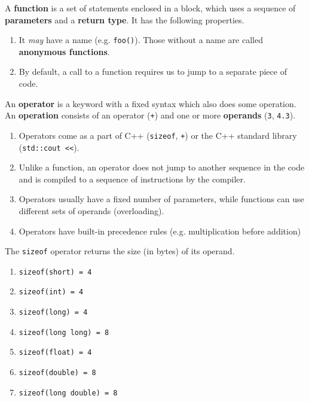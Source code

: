 \documentclass{article}
\newcounter{definition}[section]
\newcounter{code}[section]
\begin{document}
    \begin{definition}[Function]
      \label{def:function}
      A \textbf{function} is a set of statements enclosed in a block, which uses a sequence of \textbf{parameters} and a \textbf{return type}. It has the following properties. 
      \begin{enumerate}
        \item It \textit{may} have a name (e.g. \texttt{foo()}). Those without a name are called \textbf{anonymous functions}. 
        \item By default, a call to a function requires us to jump to a separate piece of code. 
      \end{enumerate}
    \end{definition}

    \begin{definition}[Operations]
      \label{def:operations}
      An \textbf{operator} is a keyword with a fixed syntax which also does some operation. An \textbf{operation} consists of an operator (\texttt{+}) and one or more \textbf{operands} (\texttt{3}, \texttt{4.3}).  
      \begin{enumerate}
        \item Operators come as a part of C++ (\texttt{sizeof}, \texttt{+}) or the C++ standard library (\texttt{std::cout <<}). 
        \item Unlike a function, an operator does not jump to another sequence in the code and is compiled to a sequence of instructions by the compiler. 
        \item Operators usually have a fixed number of parameters, while functions can use different sets of operands (overloading). 
        \item Operators have built-in precedence rules (e.g. multiplication before addition) 
      \end{enumerate}
    \end{definition}

    \begin{definition}
      \label{def:sizeof-operator}
      The \texttt{sizeof} operator returns the size (in bytes) of its operand. 
      \begin{enumerate}
        \item \texttt{sizeof(short) = 4}
        \item \texttt{sizeof(int) = 4}
        \item \texttt{sizeof(long) = 4}
        \item \texttt{sizeof(long long) = 8}
        \item \texttt{sizeof(float) = 4}
        \item \texttt{sizeof(double) = 8}
        \item \texttt{sizeof(long double) = 8}
      \end{enumerate} 
    \end{definition}
\end{document}
